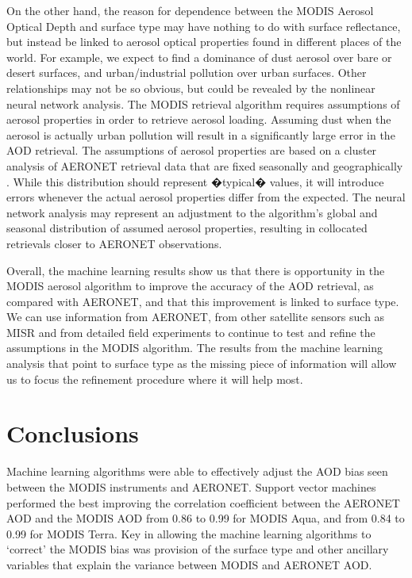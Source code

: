 \documentclass[journal]{IEEEtran}
\begin{document}
On the other hand, the reason for dependence between the MODIS Aerosol Optical Depth and surface type may have nothing to do with surface reflectance, but instead be linked to aerosol optical properties found in different places of the world.  For example, we expect to find a dominance of dust aerosol over bare or desert surfaces, and urban/industrial pollution over urban surfaces.  Other relationships may not be so obvious, but could be revealed by the nonlinear neural network analysis.  The MODIS retrieval algorithm requires assumptions of aerosol properties in order to retrieve aerosol loading.  Assuming dust when the aerosol is actually urban pollution will result in a significantly large error in the AOD retrieval.  The assumptions of aerosol properties are based on a cluster analysis of AERONET retrieval data that are fixed seasonally and geographically \cite{Levy:2007b}.  While this distribution should represent �typical� values, it will introduce errors whenever the actual aerosol properties differ from the expected.  The neural network analysis may represent an adjustment to the algorithm's global and seasonal distribution of assumed aerosol properties, resulting in collocated retrievals closer to AERONET observations.

Overall, the machine learning results show us that there is opportunity in the MODIS aerosol algorithm to improve the accuracy of the AOD retrieval, as compared with AERONET, and that this improvement is linked to surface type.  We can use information from AERONET, from other satellite sensors such as MISR and from detailed field experiments to continue to test and refine the assumptions in the MODIS algorithm.  The results from the machine learning analysis that point to surface type as the missing piece of information will allow us to focus the refinement procedure where it will help most.

\section{Conclusions \label{Section.Conclusions}}

Machine learning algorithms were able to effectively adjust the AOD bias seen between the MODIS instruments and AERONET. Support vector machines performed the best improving the correlation coefficient between the AERONET AOD and the MODIS AOD from 0.86 to 0.99 for MODIS Aqua, and from 0.84 to 0.99 for MODIS Terra. Key in allowing the machine learning algorithms to \lq correct' the MODIS bias was provision of the surface type and other ancillary variables that explain the variance between MODIS and AERONET AOD.
\end{document}
